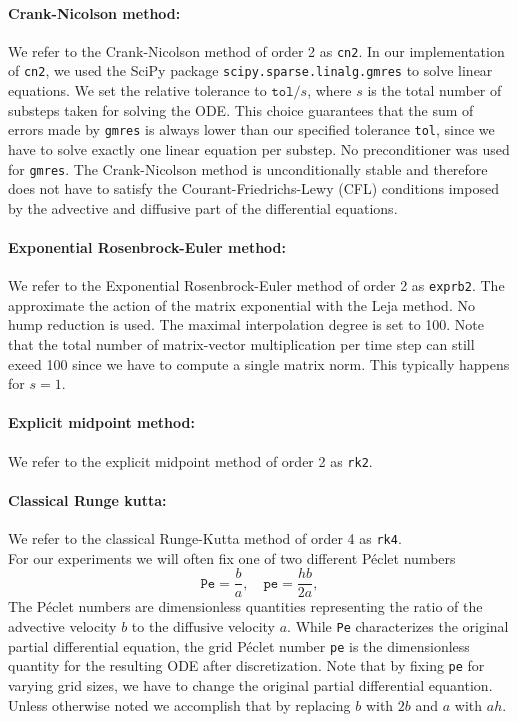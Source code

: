 \documentclass{scrartcl}
\begin{document}
\paragraph{Crank-Nicolson method:}
	We refer to the Crank-Nicolson method of order 2 as \texttt{cn2}. 
	In our implementation of \texttt{cn2}, we used the SciPy\cite{scipy} package \texttt{scipy.sparse.linalg.gmres} to solve linear equations. We set the relative tolerance to $\texttt{tol}/s$, where $s$ is the total number of substeps taken for solving the ODE. This choice guarantees that the sum of errors made by \texttt{gmres} is always lower than our specified tolerance \texttt{tol}, since we have to solve exactly one linear equation per substep. No preconditioner was used for \texttt{gmres}. The Crank-Nicolson method is unconditionally stable and therefore does not have to satisfy the Courant-Friedrichs-Lewy (CFL) conditions imposed by the advective and diffusive part of the differential equations.
	
\paragraph{Exponential Rosenbrock-Euler method:}
	We refer to the Exponential Rosenbrock-Euler method of order 2 as \texttt{exprb2}.
	The approximate the action of the matrix exponential with the Leja method. No hump reduction is used. The maximal interpolation degree is set to 100. Note that the total number of matrix-vector multiplication per time step can still exeed 100 since we have to compute a single matrix norm. This typically happens for $s=1$. 

\paragraph{Explicit midpoint method:}
	We refer to the explicit midpoint method of order 2 as \texttt{rk2}. 

\paragraph{Classical Runge kutta:}
	We refer to the classical Runge-Kutta method of order 4 as \texttt{rk4}.\\


\noindent For our experiments we will often fix one of two different P\'eclet numbers
\[\texttt{Pe} = \frac{b}{a}, \quad \texttt{pe} = \frac{hb}{2a},\]
The P\'eclet numbers are dimensionless quantities representing the ratio of the advective velocity $b$ to the diffusive velocity $a$. While \texttt{Pe} characterizes the original partial differential equation, the grid P\'eclet number \texttt{pe} is the dimensionless quantity for the resulting ODE after discretization. Note that by fixing \texttt{pe} for varying grid sizes, we have to change the original partial differential equantion. Unless otherwise noted we accomplish that by replacing $b$ with $2b$ and $a$ with $ah$.
   
\end{document}
